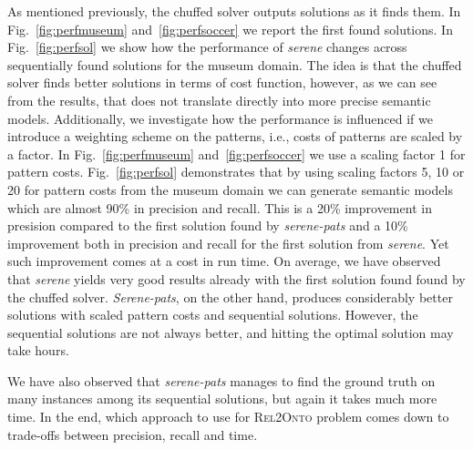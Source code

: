 \documentclass[letterpaper]{article} %
\newcommand{\relonto}{\textsc{Rel2Onto}}
\begin{document}
As mentioned previously, the chuffed solver outputs solutions as it finds them.
In Fig.~\ref{fig:perfmuseum} and~\ref{fig:perfsoccer} we report the first found solutions.
In Fig.~\ref{fig:perfsol} we show how the performance of \emph{serene} changes across sequentially found solutions for the museum domain.
The idea is that the chuffed solver finds better solutions in terms of cost function, however, as we can see from the results,
that does not translate directly into more precise semantic models.
Additionally, we investigate how the performance is influenced if we introduce a weighting scheme on the patterns,
i.e., costs of patterns are scaled by a factor.
In Fig.~\ref{fig:perfmuseum} and~\ref{fig:perfsoccer} we use a scaling factor 1 for pattern costs.
Fig.~\ref{fig:perfsol} demonstrates that by using scaling factors 5, 10 or 20 for pattern costs from the museum domain we can generate semantic models which are almost 90\% in precision and recall.
This is a 20\% improvement in presision compared to the first solution found by \emph{serene-pats} and a 10\% improvement both in precision and recall for the first solution from \emph{serene}.
Yet such improvement comes at a cost in run time.
On average, we have observed that \emph{serene} yields very good results already with the first solution found found by the chuffed solver.
\emph{Serene-pats}, on the other hand, produces considerably better solutions with scaled pattern costs and sequential solutions.
However, the sequential solutions are not always better, and hitting the optimal solution may take hours.

We have also observed that \emph{serene-pats} manages to find the ground truth on many instances among its sequential solutions, but again it takes much more time.
In the end, which approach to use for \relonto{} problem comes down to trade-offs between precision, recall and time.
\end{document}
